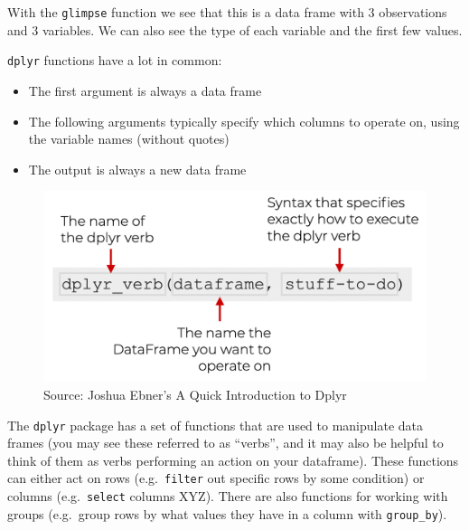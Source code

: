 \documentclass[
  letterpaper,
  DIV=11,
  numbers=noendperiod]{scrreprt}
\begin{document}
With the \texttt{glimpse} function we see that this is a data frame with
3 observations and 3 variables. We can also see the type of each
variable and the first few values.

\begin{tcolorbox}[enhanced jigsaw, left=2mm, colframe=quarto-callout-tip-color-frame, leftrule=.75mm, opacitybacktitle=0.6, toptitle=1mm, title=\textcolor{quarto-callout-tip-color}{\faLightbulb}\hspace{0.5em}{Tip}, opacityback=0, coltitle=black, colbacktitle=quarto-callout-tip-color!10!white, breakable, colback=white, titlerule=0mm, bottomrule=.15mm, arc=.35mm, bottomtitle=1mm, rightrule=.15mm, toprule=.15mm]

\texttt{dplyr} functions have a lot in common:

\begin{itemize}
\item
  The first argument is always a data frame
\item
  The following arguments typically specify which columns to operate on,
  using the variable names (without quotes)
\item
  The output is always a new data frame
\end{itemize}

\end{tcolorbox}

\begin{figure}

{\centering \includegraphics[width=1\textwidth,height=\textheight]{scripts/03_dataWrangling/wrangling-files/dplyr_syntax.png}

}

\caption{Source: Joshua Ebner's A Quick Introduction to Dplyr}

\end{figure}

The \texttt{dplyr} package has a set of functions that are used to
manipulate data frames (you may see these referred to as ``verbs'', and
it may also be helpful to think of them as verbs performing an action on
your dataframe). These functions can either act on rows
(e.g.~\texttt{filter} out specific rows by some condition) or columns
(e.g.~\texttt{select} columns XYZ). There are also functions for working
with groups (e.g.~group rows by what values they have in a column with
\texttt{group\_by}).
\end{document}
